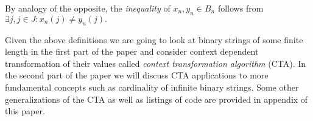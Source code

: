 By analogy of the opposite, the \textit{inequality} of $x_n,y_n \in B_n$ follows from $\exists j, j \in J: x_n(j) \neq y_n(j).$

Given the above definitions we are going to look at binary strings of some finite length in the first part of the paper and consider context dependent transformation of their values called \textit{context transformation algorithm} (CTA). In the second part of the paper we will discuss CTA applications to more fundamental concepts such as cardinality of infinite binary strings. Some other generalizations of the CTA as well as listings of code are provided in appendix of this paper.